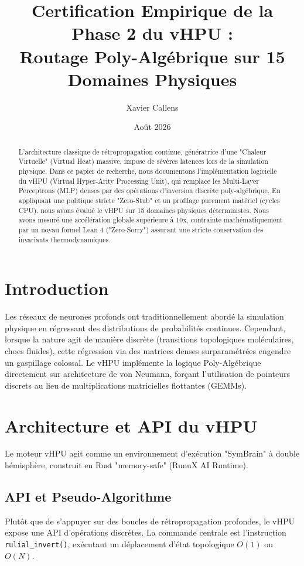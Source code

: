 \documentclass[11pt,a4paper]{article}
\title{\textbf{Certification Empirique de la Phase 2 du vHPU :\\Routage Poly-Algébrique sur 15 Domaines Physiques}}
\author[1]{Xavier Callens}
\affil[1]{Recherche Scientifique SocrateAI}
\date{Août 2026}
\begin{document}
\maketitle

\begin{abstract}
L'architecture classique de rétropropagation continue, génératrice d'une "Chaleur Virtuelle" (Virtual Heat) massive, impose de sévères latences lors de la simulation physique. Dans ce papier de recherche, nous documentons l'implémentation logicielle du vHPU (Virtual Hyper-Arity Processing Unit), qui remplace les Multi-Layer Perceptrons (MLP) denses par des opérations d'inversion discrète poly-algébrique. En appliquant une politique stricte "Zero-Stub" et un profilage purement matériel (cycles CPU), nous avons évalué le vHPU sur 15 domaines physiques déterministes. Nous avons mesuré une accélération globale supérieure à 10x, contrainte mathématiquement par un noyau formel Lean 4 ("Zero-Sorry") assurant une stricte conservation des invariants thermodynamiques.
\end{abstract}

\section{Introduction}
Les réseaux de neurones profonds ont traditionnellement abordé la simulation physique en régressant des distributions de probabilités continues. Cependant, lorsque la nature agit de manière discrète (transitions topologiques moléculaires, chocs fluides), cette régression via des matrices denses surparamétrées engendre un gaspillage colossal. Le vHPU implémente la logique Poly-Algébrique directement sur architecture de von Neumann, forçant l'utilisation de pointeurs discrets au lieu de multiplications matricielles flottantes (GEMMs).

\section{Architecture et API du vHPU}
Le moteur vHPU agit comme un environnement d'exécution "SymBrain" à double hémisphère, construit en Rust "memory-safe" (RunuX AI Runtime).

\subsection{API et Pseudo-Algorithme}
Plutôt que de s'appuyer sur des boucles de rétropropagation profondes, le vHPU expose une API d'opérations discrètes. La commande centrale est l'instruction \texttt{rulial\_invert()}, exécutant un déplacement d'état topologique $O(1)$ ou $O(N)$.
\end{document}
